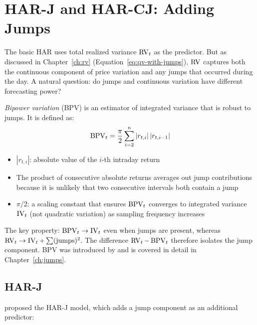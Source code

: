 \section{HAR-J and HAR-CJ: Adding Jumps}
\label{sec:har-j}

The basic HAR uses total realized variance $\operatorname{RV}_t$ as the predictor.
But as discussed in Chapter~\ref{ch:rv} (Equation~\ref{eq:qv-with-jumps}), $\operatorname{RV}$ captures both the continuous component of price variation and any jumps that occurred during the day.
A natural question: do jumps and continuous variation have different forecasting power?

\begin{prereq}
\emph{Bipower variation} (BPV) is an estimator of integrated variance that is robust to jumps.
It is defined as:
\begin{equation}
  \operatorname{BPV}_t = \frac{\pi}{2} \sum_{i=2}^{n} |r_{t,i}|\,|r_{t,i-1}|
  \label{eq:bpv-def}
\end{equation}
\begin{itemize}[nosep]
  \item $|r_{t,i}|$: absolute value of the $i$-th intraday return
  \item The product of consecutive absolute returns averages out jump contributions because it is unlikely that two consecutive intervals both contain a jump
  \item $\pi/2$: a scaling constant that ensures $\operatorname{BPV}_t$ converges to integrated variance $\operatorname{IV}_t$ (not quadratic variation) as sampling frequency increases
\end{itemize}
The key property: $\operatorname{BPV}_t \to \operatorname{IV}_t$ even when jumps are present, whereas $\operatorname{RV}_t \to \operatorname{IV}_t + \sum(\text{jumps})^2$.
The difference $\operatorname{RV}_t - \operatorname{BPV}_t$ therefore isolates the jump component.
BPV was introduced by \citet{BNS2004} and is covered in detail in Chapter~\ref{ch:jumps}.
\end{prereq}

\subsection{HAR-J}

\citet{ABD2007} proposed the HAR-J model, which adds a jump component as an additional predictor:

